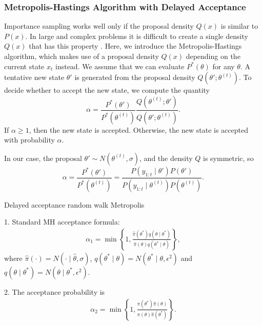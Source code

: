\subsubsection{Metropolis-Hastings Algorithm with Delayed Acceptance}

Importance sampling works well only if the proposal density $Q(x)$ is similar to $P(x)$. In large and complex problems it is difficult to create a single density $Q(x)$ that has this property \cite{mackay2003information}. Here, we introduce the Metropolis-Hastings algorithm, which makes use of a proposal density $Q(x)$ depending on the current state $x_t$ instead. We assume that we can evaluate $P^*(\theta)$ for any $\theta$. A tentative new state $\theta'$ is generated from the proposal density $Q(\theta';\theta^{(t)})$. To decide whether to accept the new state, we compute the quantity
\begin{equation*}
\alpha=\frac{P^*(\theta')}{P^*(\theta^{(t)})}\frac{Q(\theta^{(t)};\theta')}{Q(\theta';\theta^{(t)})}.
\end{equation*}
If $\alpha \geq 1$, then the new state is accepted. Otherwise, the new state is accepted with probability $\alpha$.

In our case, the proposal $\theta' \sim N(\theta^{(t)}, \sigma)$, and the density $Q$ is symmetric, so
\begin{equation*}
\alpha=\frac{P^*(\theta')}{P^*(\theta^{(t)})}=\frac{P(y_{1:t}\mid \theta')P(\theta')}{P(y_{1:t}\mid \theta^{(t)})P(\theta^{(t)})}.
\end{equation*}


Delayed acceptance random walk Metropolis \cite{sherlock2016adaptive}

1. Standard MH acceptance formula:
\begin{align*}
\alpha_1=\min\left\lbrace  1,\frac{\hat{\pi}(\theta^*)q(\theta\mid \theta^*)}{\hat{\pi}(\theta)q(\theta^*\mid \theta)}  \right\rbrace ,
\end{align*}
where $\hat{\pi}(\cdot)=N(\cdot\mid \hat{\theta},\sigma)$, $q(\theta^*\mid \theta)=N(\theta^*\mid \theta,\epsilon^2)$ and $q(\theta\mid \theta^*)=N(\theta\mid \theta^*,\epsilon^2)$.


2. The acceptance probability is
\begin{align*}
\alpha_2=\min \left\lbrace  1,\frac{\pi(\theta^*)\hat{\pi}(\theta) }{\pi(\theta)\hat{\pi}(\theta^*)} \right\rbrace.
\end{align*}

